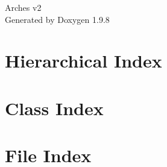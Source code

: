 \documentclass[twoside]{book}
\newcommand{\+}{\discretionary{\mbox{\scriptsize$\hookleftarrow$}}{}{}}
\newcommand{\clearemptydoublepage}{%
    \newpage{\pagestyle{empty}\cleardoublepage}%
  }
\begin{document}
  \raggedbottom
    \hypersetup{pageanchor=false,
                bookmarksnumbered=true,
                pdfencoding=unicode
               }
  \begin{titlepage}
  \vspace*{7cm}
  \begin{center}%
  {\Large Arches v2}\\
  \vspace*{1cm}
  {\large Generated by Doxygen 1.9.8}\\
  \end{center}
  \end{titlepage}
  \clearemptydoublepage
  \tableofcontents
  \clearemptydoublepage
  \hypersetup{pageanchor=true}


\chapter{Hierarchical Index}

\chapter{Class Index}

\chapter{File Index}

\end{document}
